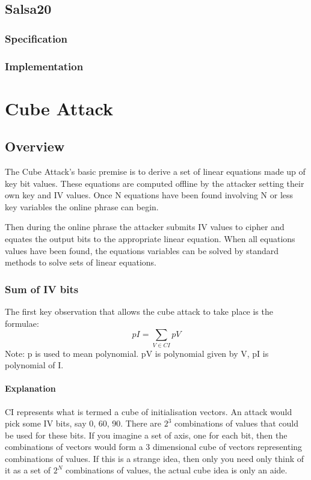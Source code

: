 \documentclass{report}
\begin{document}
\section{Salsa20}
\subsection{Specification}
\subsection{Implementation}
\chapter{Cube Attack}
\section{Overview}
The Cube Attack's basic premise is to derive a set of linear equations made up of key bit values. These equations are computed offline by the attacker setting their own key and IV values. Once N equations have been found involving N or less key variables the online phrase can begin. 

Then during the online phrase the attacker submits IV values to cipher and equates the output bits to the appropriate linear equation. When all equations values have been found, the equations variables can be solved by standard methods to solve sets of linear equations.
\subsection{Sum of IV bits}
The first key observation that allows the cube attack to take place is the formulae:
\begin{equation} \label{eq:GFpowers}
pI = \sum\limits_{V \in CI} pV 
\end{equation}
Note: p is used to mean polynomial. pV is polynomial given by V, pI is polynomial of I.
\subsubsection{Explanation}
CI represents what is termed a cube of initialisation vectors. An attack would pick some IV bits, say 0, 60, 90. There are $2^3$ combinations of values that could be used for these bits. If you imagine a set of axis, one for each bit, then the combinations of vectors would form a 3 dimensional cube of vectors representing combinations of values. If this is a strange idea, then only you need only think of it as a set of $2^N$ combinations of values, the actual cube idea is only an aide.
\end{document}
